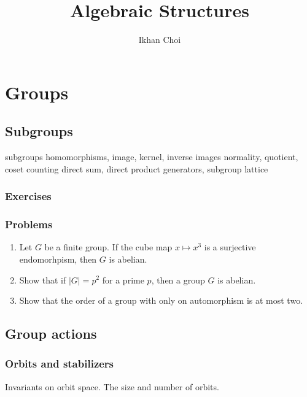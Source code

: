 \documentclass{../../large}
\begin{document}
\title{Algebraic Structures}
\author{Ikhan Choi}
\maketitle
\tableofcontents

\part{Groups}
\chapter{Subgroups}
subgroups
homomorphisms, image, kernel, inverse images
normality, quotient, coset counting
direct sum, direct product
generators, subgroup lattice



\section*{Exercises}

\section*{Problems}
\begin{enumerate}
\item Let $G$ be a finite group. If the cube map $x\mapsto x^3$ is a surjective endomorhpism, then $G$ is abelian.
\item Show that if $|G|=p^2$ for a prime $p$, then a group $G$ is abelian.
\item Show that the order of a group with only on automorphism is at most two.
\end{enumerate}









\chapter{Group actions}
\section{Orbits and stabilizers}
Invariants on orbit space.
The size and number of orbits.
\end{document}
